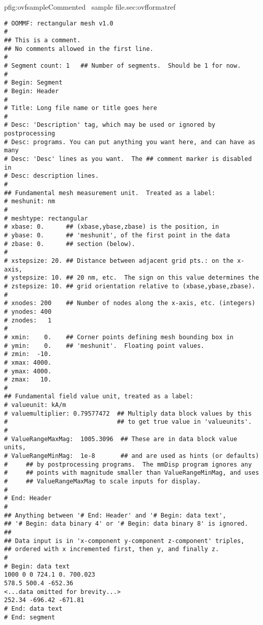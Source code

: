\begin{codelisting}{p}{fig:ovfsample}{Commented \OVF\ sample
  file.}{sec:ovfformat}{ref}
\begin{verbatim}
# OOMMF: rectangular mesh v1.0
#
## This is a comment.
## No comments allowed in the first line.
#
# Segment count: 1   ## Number of segments.  Should be 1 for now.
#
# Begin: Segment
# Begin: Header
#
# Title: Long file name or title goes here
#
# Desc: 'Description' tag, which may be used or ignored by postprocessing
# Desc: programs. You can put anything you want here, and can have as many
# Desc: 'Desc' lines as you want.  The ## comment marker is disabled in
# Desc: description lines.
#
## Fundamental mesh measurement unit.  Treated as a label:
# meshunit: nm
#
# meshtype: rectangular
# xbase: 0.      ## (xbase,ybase,zbase) is the position, in
# ybase: 0.      ## 'meshunit', of the first point in the data
# zbase: 0.      ## section (below).
#
# xstepsize: 20. ## Distance between adjacent grid pts.: on the x-axis,
# ystepsize: 10. ## 20 nm, etc.  The sign on this value determines the
# zstepsize: 10. ## grid orientation relative to (xbase,ybase,zbase).
#
# xnodes: 200    ## Number of nodes along the x-axis, etc. (integers)
# ynodes: 400
# znodes:   1
#
# xmin:    0.    ## Corner points defining mesh bounding box in
# ymin:    0.    ## 'meshunit'.  Floating point values.
# zmin:  -10.
# xmax: 4000.
# ymax: 4000.
# zmax:   10.
#
## Fundamental field value unit, treated as a label:
# valueunit: kA/m
# valuemultiplier: 0.79577472  ## Multiply data block values by this
#                              ## to get true value in 'valueunits'.
#
# ValueRangeMaxMag:  1005.3096  ## These are in data block value units,
# ValueRangeMinMag:  1e-8       ## and are used as hints (or defaults)
#     ## by postprocessing programs.  The mmDisp program ignores any
#     ## points with magnitude smaller than ValueRangeMinMag, and uses
#     ## ValueRangeMaxMag to scale inputs for display.
#
# End: Header
#
## Anything between '# End: Header' and '# Begin: data text',
## '# Begin: data binary 4' or '# Begin: data binary 8' is ignored.
##
## Data input is in 'x-component y-component z-component' triples,
## ordered with x incremented first, then y, and finally z.
#
# Begin: data text
1000 0 0 724.1 0. 700.023
578.5 500.4 -652.36
<...data omitted for brevity...>
252.34 -696.42 -671.81
# End: data text
# End: segment
\end{verbatim}
\end{codelisting}

